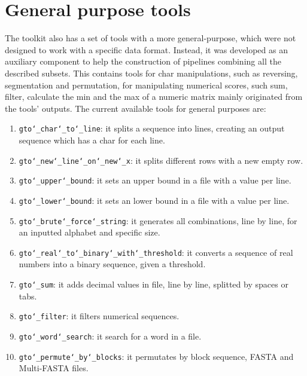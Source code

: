 \chapter{General purpose tools}
\label{seq}
The toolkit also has a set of tools with a more general-purpose, which were not designed to work with a specific data format. Instead, it was developed as an auxiliary component to help the construction of pipelines combining all the described subsets. This contains tools for char manipulations, such as reversing, segmentation and permutation, for manipulating numerical scores, such sum, filter, calculate the min and the max of a numeric matrix mainly originated from the tools' outputs. The current available tools for general purposes are:
\begin{enumerate}

\item \texttt{gto\char`_char\char`_to\char`_line}: it splits a sequence into lines, creating an output sequence which has a char for each line.

\item \texttt{gto\char`_new\char`_line\char`_on\char`_new\char`_x}: it splits different rows with a new empty row.

\item \texttt{gto\char`_upper\char`_bound}: it sets an upper bound in a file with a value per line.

\item \texttt{gto\char`_lower\char`_bound}: it sets an lower bound in a file with a value per line.

\item \texttt{gto\char`_brute\char`_force\char`_string}: it generates all combinations, line by line, for an inputted alphabet and specific size.

\item \texttt{gto\char`_real\char`_to\char`_binary\char`_with\char`_threshold}: it converts a sequence of real numbers into a binary sequence, given a threshold.

\item \texttt{gto\char`_sum}: it adds decimal values in file, line by line, splitted by spaces or tabs.

\item \texttt{gto\char`_filter}: it filters numerical sequences.

\item \texttt{gto\char`_word\char`_search}: it search for a word in a file.

\item \texttt{gto\char`_permute\char`_by\char`_blocks}: it permutates by block sequence, FASTA and Multi-FASTA files. 


\end{enumerate}
